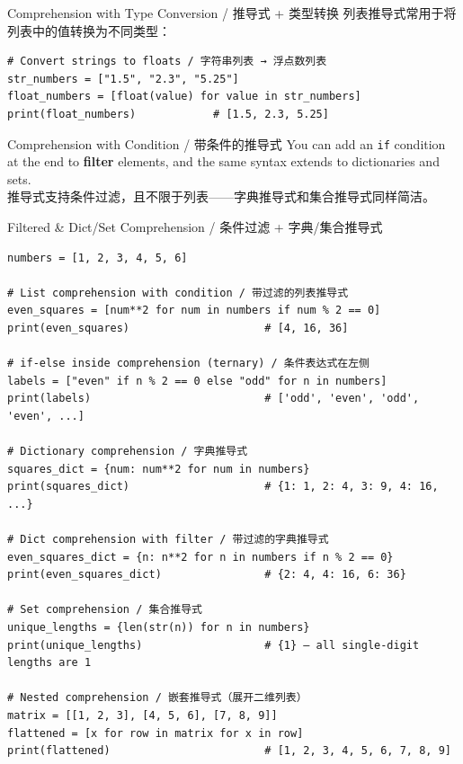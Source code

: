 \documentclass[11pt,a4paper]{report}
\let\oldtexttt\texttt
\renewcommand{\texttt}[1]{\textcolor{mainblue}{\oldtexttt{#1}}}
\begin{document}
\begin{examplebox}{Comprehension with Type Conversion / 推导式 + 类型转换}
    列表推导式常用于将列表中的值转换为不同类型：
\begin{lstlisting}
# Convert strings to floats / 字符串列表 → 浮点数列表
str_numbers = ["1.5", "2.3", "5.25"]
float_numbers = [float(value) for value in str_numbers]
print(float_numbers)            # [1.5, 2.3, 5.25]
\end{lstlisting}
\end{examplebox}

\begin{concept}{Comprehension with Condition / 带条件的推导式}
    You can add an \texttt{if} condition at the end to \textbf{filter} elements, and the same syntax extends to dictionaries and sets. \\
    推导式支持条件过滤，且不限于列表——字典推导式和集合推导式同样简洁。
\end{concept}

\begin{examplebox}{Filtered \& Dict/Set Comprehension / 条件过滤 + 字典/集合推导式}
\begin{lstlisting}
numbers = [1, 2, 3, 4, 5, 6]

# List comprehension with condition / 带过滤的列表推导式
even_squares = [num**2 for num in numbers if num % 2 == 0]
print(even_squares)                     # [4, 16, 36]

# if-else inside comprehension (ternary) / 条件表达式在左侧
labels = ["even" if n % 2 == 0 else "odd" for n in numbers]
print(labels)                           # ['odd', 'even', 'odd', 'even', ...]

# Dictionary comprehension / 字典推导式
squares_dict = {num: num**2 for num in numbers}
print(squares_dict)                     # {1: 1, 2: 4, 3: 9, 4: 16, ...}

# Dict comprehension with filter / 带过滤的字典推导式
even_squares_dict = {n: n**2 for n in numbers if n % 2 == 0}
print(even_squares_dict)                # {2: 4, 4: 16, 6: 36}

# Set comprehension / 集合推导式
unique_lengths = {len(str(n)) for n in numbers}
print(unique_lengths)                   # {1} — all single-digit lengths are 1

# Nested comprehension / 嵌套推导式（展开二维列表）
matrix = [[1, 2, 3], [4, 5, 6], [7, 8, 9]]
flattened = [x for row in matrix for x in row]
print(flattened)                        # [1, 2, 3, 4, 5, 6, 7, 8, 9]
\end{lstlisting}
\end{examplebox}
\end{document}
